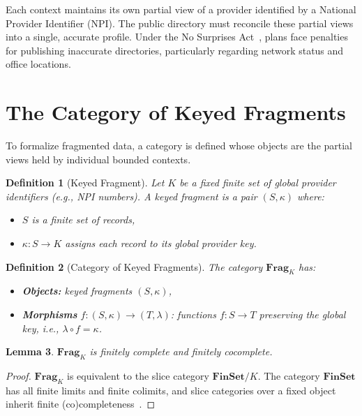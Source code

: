 \documentclass[11pt,a4paper]{article}
\newtheorem{definition}{Definition}[section]
\newtheorem{lemma}[definition]{Lemma}
\begin{document}
\noindent
Each context maintains its own partial view of a provider identified by
a National Provider Identifier (NPI). The public directory must
reconcile these partial views into a single, accurate profile. Under the
No Surprises Act~\citep{nosurprisesact2022}, plans face penalties for
publishing inaccurate directories, particularly regarding network status
and office locations.

\section{The Category of Keyed Fragments}
\label{sec:fragments}

To formalize fragmented data, a category is defined whose objects are
the partial views held by individual bounded contexts.

\begin{definition}[Keyed Fragment]
\label{def:keyed-fragment}
Let $K$ be a fixed finite set of global provider identifiers (e.g., NPI
numbers). A \emph{keyed fragment} is a pair $(S,\kappa)$ where:
\begin{itemize}
  \item $S$ is a finite set of records,
  \item $\kappa:S\to K$ assigns each record to its global provider key.
\end{itemize}
\end{definition}

\begin{definition}[Category of Keyed Fragments]
\label{def:frag-category}
The category $\mathbf{Frag}_K$ has:
\begin{itemize}
  \item \textbf{Objects:} keyed fragments $(S,\kappa)$,
  \item \textbf{Morphisms} $f:(S,\kappa)\to(T,\lambda)$: functions
    $f:S\to T$ preserving the global key, i.e., $\lambda \circ f = \kappa$.
\end{itemize}
\end{definition}

\begin{lemma}
\label{lem:frag-completeness}
$\mathbf{Frag}_K$ is finitely complete and finitely cocomplete.
\end{lemma}

\begin{proof}
$\mathbf{Frag}_K$ is equivalent to the slice category
$\mathbf{FinSet}/K$. The category $\mathbf{FinSet}$ has all finite
limits and finite colimits, and slice categories over a fixed object
inherit finite (co)completeness~\citep{maclane1998}.
\end{proof}
\end{document}
